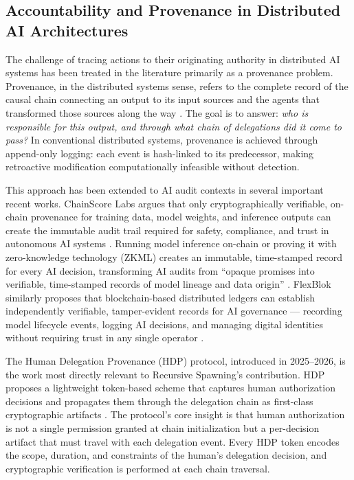 \subsection{Accountability and Provenance in Distributed AI Architectures}\label{sec:provenance}

The challenge of tracing actions to their originating authority in distributed AI systems has been treated in the literature primarily as a provenance problem.  Provenance, in the distributed systems sense, refers to the complete record of the causal chain connecting an output to its input sources and the agents that transformed those sources along the way \cite{on_chain_provenance_ai}.  The goal is to answer: \emph{who is responsible for this output, and through what chain of delegations did it come to pass?}  In conventional distributed systems, provenance is achieved through append-only logging: each event is hash-linked to its predecessor, making retroactive modification computationally infeasible without detection.

This approach has been extended to AI audit contexts in several important recent works.  ChainScore Labs argues that only cryptographically verifiable, on-chain provenance for training data, model weights, and inference outputs can create the immutable audit trail required for safety, compliance, and trust in autonomous AI systems \cite{on_chain_provenance_ai}.  Running model inference on-chain or proving it with zero-knowledge technology (ZKML) creates an immutable, time-stamped record for every AI decision, transforming AI audits from ``opaque promises into verifiable, time-stamped records of model lineage and data origin'' \cite{on_chain_provenance_ai}.  FlexBlok similarly proposes that blockchain-based distributed ledgers can establish independently verifiable, tamper-evident records for AI governance --- recording model lifecycle events, logging AI decisions, and managing digital identities without requiring trust in any single operator \cite{blockchain_ai_governance}.

The Human Delegation Provenance (HDP) protocol, introduced in 2025--2026, is the work most directly relevant to Recursive Spawning's contribution.  HDP proposes a lightweight token-based scheme that captures human authorization decisions and propagates them through the delegation chain as first-class cryptographic artifacts \cite{hdp2025arxiv}.  The protocol's core insight is that human authorization is not a single permission granted at chain initialization but a per-decision artifact that must travel with each delegation event.  Every HDP token encodes the scope, duration, and constraints of the human's delegation decision, and cryptographic verification is performed at each chain traversal.

